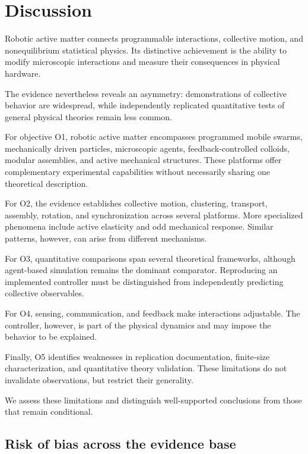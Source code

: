 \section{Discussion}\label{sec:discussion}

Robotic active matter connects programmable interactions,
collective motion, and nonequilibrium statistical physics.
Its distinctive achievement is the ability to modify
microscopic interactions and measure their consequences
in physical hardware.

The evidence nevertheless reveals an asymmetry:
demonstrations of collective behavior are widespread,
while independently replicated quantitative tests of
general physical theories remain less common.

For objective O1, robotic active matter encompasses
programmed mobile swarms, mechanically driven particles,
microscopic agents, feedback-controlled colloids,
modular assemblies, and active mechanical structures.
These platforms offer complementary experimental
capabilities without necessarily sharing one
theoretical description.

For O2, the evidence establishes collective motion,
clustering, transport, assembly, rotation, and
synchronization across several platforms.
More specialized phenomena include active elasticity
and odd mechanical response. Similar patterns,
however, can arise from different mechanisms.

For O3, quantitative comparisons span several
theoretical frameworks, although agent-based
simulation remains the dominant comparator.
Reproducing an implemented controller must
be distinguished from independently predicting
collective observables.

For O4, sensing, communication, and feedback
make interactions adjustable. The controller,
however, is part of the physical dynamics
and may impose the behavior to be explained.

Finally, O5 identifies weaknesses in replication
documentation, finite-size characterization,
and quantitative theory validation. These
limitations do not invalidate observations,
but restrict their generality.

We assess these limitations and distinguish
well-supported conclusions from those
that remain conditional.

\subsection{Risk of bias across the evidence base}
\label{sec:discussion-risk}

